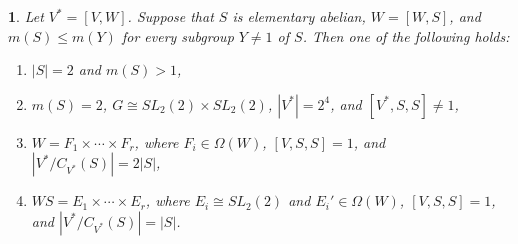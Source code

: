 \documentclass[11pt]{article}
\theoremstyle{plain}
\theoremstyle{stmplain}
\newtheorem{stm}{}[section]
\begin{document}
\begin{stm}\label{st:1.6}
Let $V^* = [V, W]$. Suppose that $S$ is elementary abelian, $W = [W, S]$, and
$m(S) \le m(Y)$ for every subgroup $Y \ne 1$ of $S$. Then one of the following
holds:
\begin{enumerate}
\item[(a)] $|S| = 2$ and $m(S) > 1$,
\item[(b)] $m(S) = 2$, $G \cong SL_2(2) \times SL_2(2)$, $|V^*| = 2^4$, and
  $[V^*, S, S] \ne 1$,
\item[(c)] $W = F_1 \times \cdots \times F_r$, where $F_i \in \Omega(W)$,
  $[V, S, S] = 1$, and $|V^*/C_{V^*}(S)| = 2|S|$,
\item[(d)] $WS = E_1 \times \cdots \times E_r$, where $E_i \cong SL_2(2)$ and
  $E_i' \in \Omega(W)$, $[V, S, S] = 1$, and $|V^*/C_{V^*}(S)| = |S|$.
\end{enumerate}
\end{stm}
\end{document}
